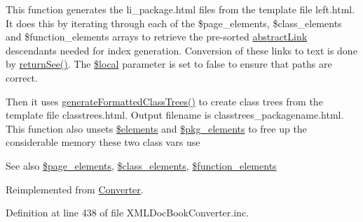 \-This function generates the li\-\_\-package.\-html files from the template file left.\-html. \-It does this by iterating through each of the \$page\-\_\-elements, \$class\-\_\-elements and \$function\-\_\-elements arrays to retrieve the pre-\/sorted \hyperlink{classabstract_link}{abstract\-Link} descendants needed for index generation. \-Conversion of these links to text is done by \hyperlink{class_x_m_l_doc_book_converter_aabb194e1ca02651a000846412f0049ff}{return\-See()}. \-The \hyperlink{class_x_m_l_doc_book_converter_a6d3acd7bb365291cea0fc4b71fe5682a}{\$local} parameter is set to false to ensure that paths are correct.

\-Then it uses \hyperlink{class_x_m_l_doc_book_converter_ac4ce6d55dd5c5683966b882dcc6809e0}{generate\-Formatted\-Class\-Trees()} to create class trees from the template file classtrees.\-html. \-Output filename is classtrees\-\_\-packagename.\-html. \-This function also unsets \hyperlink{class_converter_ad18dd8fbe31b294e2bc4711dcde4548d}{\$elements} and \hyperlink{class_converter_af833d646cb2d71e00831b24d1cbd9cdf}{\$pkg\-\_\-elements} to free up the considerable memory these two class vars use \begin{DoxySeeAlso}{\-See also}
\hyperlink{class_converter_a5dc95f781b9a381af6fb199035074f47}{\$page\-\_\-elements}, \hyperlink{class_converter_a82c1ed609548471e99d13d57cefef0bf}{\$class\-\_\-elements}, \hyperlink{class_converter_a47fa3296f67608f4eaefa27f2b058039}{\$function\-\_\-elements} 
\end{DoxySeeAlso}


\-Reimplemented from \hyperlink{class_converter_a39bb30299ec5d6ba31096e51f2bcc4b4}{\-Converter}.



\-Definition at line 438 of file \-X\-M\-L\-Doc\-Book\-Converter.\-inc.


